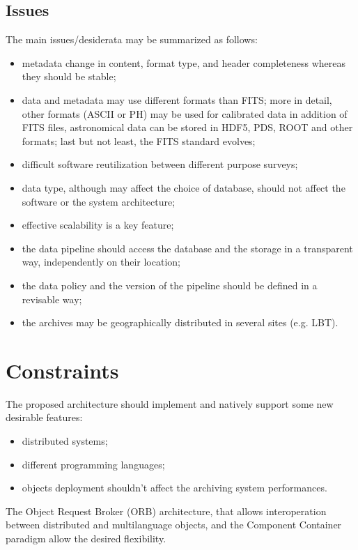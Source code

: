 \subsection{Issues}
The main issues/desiderata may be summarized as follows:
\begin{itemize}
\item metadata change in content, format type, and header completeness whereas
they should be stable;
\item data and metadata may use different formats than FITS; more in detail, 
other formats (ASCII or PH) may be used for calibrated data in addition of FITS
files, astronomical data can be stored in HDF5, PDS, ROOT and other formats;
last but not least, the FITS standard evolves;
\item difficult software reutilization between different purpose surveys;
\item data type, although may affect the choice of database, should not affect
the software or the system architecture;
\item effective scalability is a key feature;
\item the data pipeline should access the database and the storage in a
transparent way, independently on their location;
\item the data policy and the version of the pipeline should be defined in a revisable way;
\item the archives may be geographically distributed in several sites (e.g. LBT).
\end{itemize}

\section{Constraints}
The proposed architecture should implement and natively support some new desirable features:
\begin{itemize}
  \item distributed systems;
  \item different programming languages;
  \item objects deployment shouldn't affect the archiving system performances.
\end{itemize}
The Object Request Broker (ORB) architecture, that allows interoperation between
distributed and multilanguage objects, and the Component Container paradigm allow
the desired flexibility.

